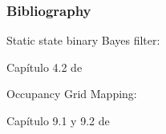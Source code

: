\begin{frame}
	\frametitle{Bibliography}
   
    Static state binary Bayes filter:
    
    Capítulo 4.2 de \cite{thrun2005probabilistic}
    
    Occupancy Grid Mapping:
    
    Capítulo 9.1 y 9.2 de \cite{thrun2005probabilistic}
	
	\printbibliography
	
\end{frame}
